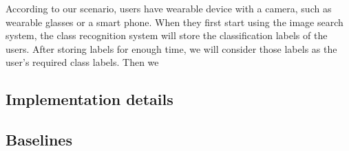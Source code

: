 According to our scenario, users have wearable device with a camera, such as wearable glasses or a smart phone. 
When they first start using the image search system, the class recognition system will store the classification labels of the users. 
After storing labels for enough time, we will consider those labels as the user's required class labels.
Then we 





\subsection{Implementation details}

\subsection{Baselines}

